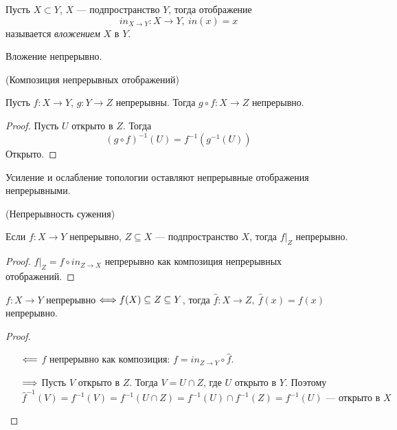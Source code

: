 \begin{definition}
	Пусть $X \subset Y$, $X$ --- подпространство $Y$,
	тогда отображение 
\[
	in_{X \to Y} \colon X \to Y, ~in(x) = x
\]
	называется \textit{вложением} $X$ в $Y$.
\end{definition}

\begin{remark}
	Вложение непрерывно.
\end{remark}

\begin{theorem}(Композиция непрерывных отображений)

	Пусть $f \colon X \to Y$, $g \colon Y \to Z$ непрерывны. Тогда
	$g \circ f \colon X \to Z$ непрерывно.
\end{theorem}
\begin{proof}
	Пусть $U$ открыто в $Z$. Тогда
\[
	(g \circ f)^{-1}(U) = f^{-1}(g^{-1}(U))
\]
	Открыто.
\end{proof}

\begin{remark}
	Усиление и ослабление топологии оставляют непрерывные отображения непрерывными.
\end{remark}

\begin{theorem}(Непрерывность сужения)
	
	Если $f \colon X \to Y$ непрерывно, $Z \subseteq X$ --- подпространство $X$,
	тогда $f\big|_Z$ непрерывно.
\end{theorem}
\begin{proof}
	$f\big|_Z = f \circ in_{Z \to X}$ непрерывно как композиция непрерывных отображений.
\end{proof}

\begin{theorem}

	$f \colon X \to Y$ непрерывно $\Longleftrightarrow f(X) \subseteq Z \subseteq Y$,
	тогда $\hat{f} \colon X \to Z,~ \hat{f}(x) = f(x)$ непрерывно.
\end{theorem}
\begin{proof}
	\enewline
	\begin{itemize}
		\item[$\Longleftarrow$] $f$ непрерывно как композиция: $f =
			in_{Z \to Y} \circ \hat{f}$.
		\item[$\Longrightarrow$] Пусть $V$ открыто в $Z$. Тогда $V = U \cap Z$, где $U$
			открыто в $Y$. Поэтому
\[
	\hat{f}^{-1}(V) = f^{-1}(V) = f^{-1}(U \cap Z) = f^{-1}(U) \cap f^{-1}(Z)
	= f^{-1}(U) \text{ --- открыто в } X
\]
	\end{itemize}
\end{proof}

